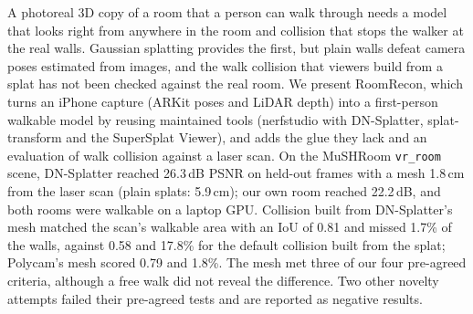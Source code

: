 A photoreal 3D copy of a room that a person can walk through needs a model that looks right from anywhere in the room and collision that stops the walker at the real walls. Gaussian splatting provides the first, but plain walls defeat camera poses estimated from images, and the walk collision that viewers build from a splat has not been checked against the real room. We present RoomRecon, which turns an iPhone capture (ARKit poses and LiDAR depth) into a first-person walkable model by reusing maintained tools (nerfstudio with DN-Splatter, splat-transform and the SuperSplat Viewer), and adds the glue they lack and an evaluation of walk collision against a laser scan. On the MuSHRoom \texttt{vr\_room} scene, DN-Splatter reached 26.3\,dB PSNR on held-out frames with a mesh 1.8\,cm from the laser scan (plain splats: 5.9\,cm); our own room reached 22.2\,dB, and both rooms were walkable on a laptop GPU. Collision built from DN-Splatter's mesh matched the scan's walkable area with an IoU of 0.81 and missed 1.7\% of the walls, against 0.58 and 17.8\% for the default collision built from the splat; Polycam's mesh scored 0.79 and 1.8\%. The mesh met three of our four pre-agreed criteria, although a free walk did not reveal the difference. Two other novelty attempts failed their pre-agreed tests and are reported as negative results.
